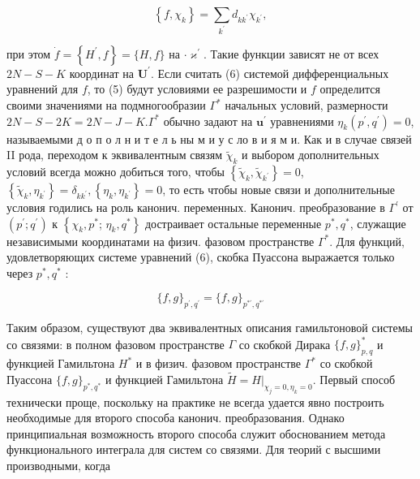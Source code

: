 \documentclass[10pt]{article}
\begin{document}
\[

\left\{f, \chi_{k}\right\}=\sum_{k^{\prime}} d_{k k^{\prime}} \chi_{k^{\prime}},

\]



при этом $\dot{f}=\left\{H^{\prime}, f\right\}=\{H, f\}$ на $\cdot \boldsymbol{\varkappa}^{\prime}$. Такие функции зависят не от всех $2 N-S-K$ координат на $\boldsymbol{U}^{\prime}$. Если считать (6) системой дифференциальных уравнений для $f$, то (5) будут условиями ее разрешимости и $f$ определится своими значениями на подмногообразии $\Gamma^{*}$ начальных условий, размерности $2 N-S-2 K=2 N-J-K . \Gamma^{*}$ обычно задают на $\boldsymbol{u}^{\prime}$ уравнениями $\eta_{k}\left(p^{\prime}, q^{\prime}\right)=0$, называемыми д о п о л н и т е л ь ны м и у с ло в и я м и. Как и в случае связей II рода, переходом к эквивалентным связям $\tilde{\chi}_{k}$ и выбором дополнительных условий всегда можно добиться того, чтобы $\left\{\tilde{\chi}_{k}, \tilde{\chi}_{k^{\prime}}\right\}=0$, $\left\{\tilde{\chi}_{k}, \eta_{k^{\prime}}\right\}=\delta_{k k^{\prime}},\left\{\eta_{k}, \eta_{k^{\prime}}\right\}=0$, то есть чтобы новые связи и дополнительные условия годились на роль канонич. переменных. Канонич. преобразование в $\Gamma^{\prime}$ от $\left(p^{\prime} ; q^{\prime}\right)$ к $\left\{\chi_{k}, p^{*}\right.$; $\left.\eta_{k}, q^{*}\right\}$ достраивает остальные переменные $p^{*}, q^{*}$, служащие независимыми координатами на физич. фазовом пространстве $\Gamma^{*}$. Для функций, удовлетворяющих системе уравнений (6), скобка Пуассона выражается только через $p^{*}, q^{*}$ :



\[

\{f, g\}_{p^{\prime}, q^{\prime}}=\{f, g\}_{p^{* \prime}, q^{* \prime}}

\]



Таким образом, существуют два эквивалентных описания гамильтоновой системы со связями: в полном фазовом пространстве $\Gamma$ со скобкой Дирака $\{f, g\}_{p, q}^{*}$ и функцией Гамильтона $H^{*}$ и в физич. фазовом пространстве $\Gamma^{*}$ со скобкой Пуассона $\{f, g\}_{p^{*}, q^{*}}$ и функцией Гамильтона $\widetilde{H}=\left.H\right|_{\chi_{j}=0, \eta_{k}=0}$. Первый способ технически проще, поскольку на практике не всегда удается явно построить необходимые для второго способа канонич. преобразования. Однако принципиальная возможность второго способа служит обоснованием метода функционального интеграла для систем со связями. Для теорий с высшими производными, когда
\end{document}
